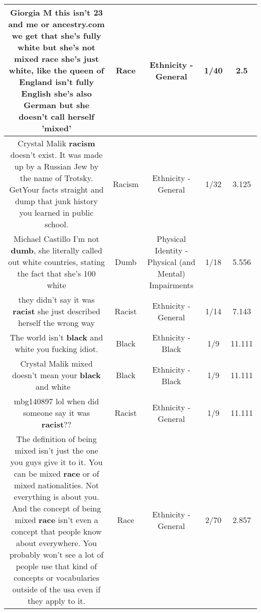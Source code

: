 \documentclass[11pt]{article}
\newlength\mylength
\begin{document}
\begin{center}
\begin{longtable}{|C{.65\mylength}|C{.30\mylength}|C{.12\mylength}|C{.12\mylength}|C{.12\mylength}|}
  \small Giorgia M this isn't 23 and me or ancestry.com we get that she's fully white but she's not mixed \textbf{race} she's just white, like the queen of England isn't fully English she's also German but she doesn't call herself 'mixed'\normalsize   & Race & Ethnicity - General & 1/40 & 2.5 \\  \hline
  \small Crystal Malik \textbf{racism} doesn't exist. It was made up by a Russian Jew by the name of Trotsky. GetYour facts straight and dump that junk history you learned in public school.\normalsize   & Racism & Ethnicity - General & 1/32 & 3.125 \\  \hline
  \small Michael Castillo I'm not \textbf{dumb}, she literally called out white countries, stating the fact that she's 100 white\normalsize   & Dumb & Physical Identity - Physical (and Mental) Impairments & 1/18 & 5.556 \\  \hline
  \small {} they didn't say it was \textbf{racist} she just described herself the wrong way\normalsize   & Racist & Ethnicity - General & 1/14 & 7.143 \\  \hline
  \small The world isn't \textbf{black} and white you fucking idiot.\normalsize   & Black & Ethnicity - Black & 1/9 & 11.111 \\  \hline
  \small Crystal Malik mixed doesn't mean your \textbf{black} and white🤦🏻‍♀️\normalsize   & Black & Ethnicity - Black & 1/9 & 11.111 \\  \hline
  \small mbg140897 lol when did someone say it was \textbf{racist}??\normalsize   & Racist & Ethnicity - General & 1/9 & 11.111 \\  \hline
  \small The definition of being mixed isn't just the one you guys give it to it. You can be mixed \textbf{race} or of mixed nationalities. Not everything is about you. And the concept of being mixed \textbf{race} isn't even a concept that people know about everywhere. You probably won't see a lot of people use that kind of concepts or vocabularies outside of the usa even if they apply to it.\normalsize   & Race & Ethnicity - General & 2/70 & 2.857 \\  \hline

\end{longtable}
\end{center}
\end{document}
